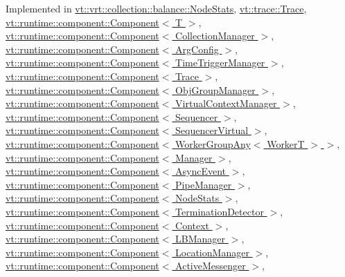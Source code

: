 Implemented in \hyperlink{structvt_1_1vrt_1_1collection_1_1balance_1_1_node_stats_a0c60d1566daa6465f56b09e27058d6a1}{vt\+::vrt\+::collection\+::balance\+::\+Node\+Stats}, \hyperlink{structvt_1_1trace_1_1_trace_a24019edd964c0a307008f8d6a0f1f825}{vt\+::trace\+::\+Trace}, \hyperlink{structvt_1_1runtime_1_1component_1_1_component_a7f07384d294e59796add9ce6be2d6410}{vt\+::runtime\+::component\+::\+Component$<$ T $>$}, \hyperlink{structvt_1_1runtime_1_1component_1_1_component_a7f07384d294e59796add9ce6be2d6410}{vt\+::runtime\+::component\+::\+Component$<$ Collection\+Manager $>$}, \hyperlink{structvt_1_1runtime_1_1component_1_1_component_a7f07384d294e59796add9ce6be2d6410}{vt\+::runtime\+::component\+::\+Component$<$ Arg\+Config $>$}, \hyperlink{structvt_1_1runtime_1_1component_1_1_component_a7f07384d294e59796add9ce6be2d6410}{vt\+::runtime\+::component\+::\+Component$<$ Time\+Trigger\+Manager $>$}, \hyperlink{structvt_1_1runtime_1_1component_1_1_component_a7f07384d294e59796add9ce6be2d6410}{vt\+::runtime\+::component\+::\+Component$<$ Trace $>$}, \hyperlink{structvt_1_1runtime_1_1component_1_1_component_a7f07384d294e59796add9ce6be2d6410}{vt\+::runtime\+::component\+::\+Component$<$ Obj\+Group\+Manager $>$}, \hyperlink{structvt_1_1runtime_1_1component_1_1_component_a7f07384d294e59796add9ce6be2d6410}{vt\+::runtime\+::component\+::\+Component$<$ Virtual\+Context\+Manager $>$}, \hyperlink{structvt_1_1runtime_1_1component_1_1_component_a7f07384d294e59796add9ce6be2d6410}{vt\+::runtime\+::component\+::\+Component$<$ Sequencer $>$}, \hyperlink{structvt_1_1runtime_1_1component_1_1_component_a7f07384d294e59796add9ce6be2d6410}{vt\+::runtime\+::component\+::\+Component$<$ Sequencer\+Virtual $>$}, \hyperlink{structvt_1_1runtime_1_1component_1_1_component_a7f07384d294e59796add9ce6be2d6410}{vt\+::runtime\+::component\+::\+Component$<$ Worker\+Group\+Any$<$ Worker\+T $>$ $>$}, \hyperlink{structvt_1_1runtime_1_1component_1_1_component_a7f07384d294e59796add9ce6be2d6410}{vt\+::runtime\+::component\+::\+Component$<$ Manager $>$}, \hyperlink{structvt_1_1runtime_1_1component_1_1_component_a7f07384d294e59796add9ce6be2d6410}{vt\+::runtime\+::component\+::\+Component$<$ Async\+Event $>$}, \hyperlink{structvt_1_1runtime_1_1component_1_1_component_a7f07384d294e59796add9ce6be2d6410}{vt\+::runtime\+::component\+::\+Component$<$ Pipe\+Manager $>$}, \hyperlink{structvt_1_1runtime_1_1component_1_1_component_a7f07384d294e59796add9ce6be2d6410}{vt\+::runtime\+::component\+::\+Component$<$ Node\+Stats $>$}, \hyperlink{structvt_1_1runtime_1_1component_1_1_component_a7f07384d294e59796add9ce6be2d6410}{vt\+::runtime\+::component\+::\+Component$<$ Termination\+Detector $>$}, \hyperlink{structvt_1_1runtime_1_1component_1_1_component_a7f07384d294e59796add9ce6be2d6410}{vt\+::runtime\+::component\+::\+Component$<$ Context $>$}, \hyperlink{structvt_1_1runtime_1_1component_1_1_component_a7f07384d294e59796add9ce6be2d6410}{vt\+::runtime\+::component\+::\+Component$<$ L\+B\+Manager $>$}, \hyperlink{structvt_1_1runtime_1_1component_1_1_component_a7f07384d294e59796add9ce6be2d6410}{vt\+::runtime\+::component\+::\+Component$<$ Location\+Manager $>$}, \hyperlink{structvt_1_1runtime_1_1component_1_1_component_a7f07384d294e59796add9ce6be2d6410}{vt\+::runtime\+::component\+::\+Component$<$ Active\+Messenger $>$}, 